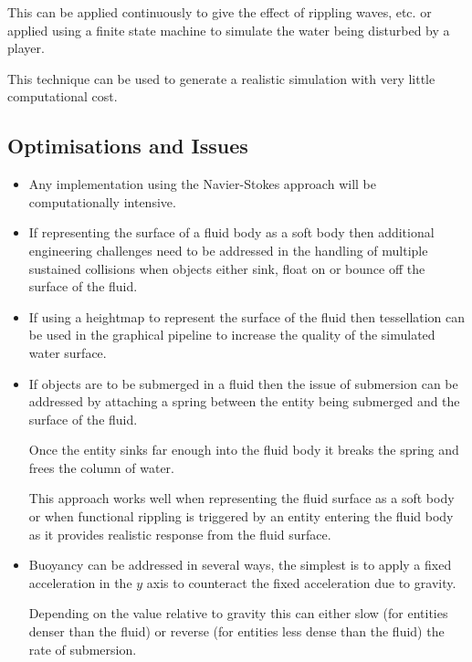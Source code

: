 \documentclass[a4paper]{article}
\begin{document}
This can be applied continuously to give the effect of rippling waves, etc. or
applied using a finite state machine to simulate the water being disturbed by a
player.

This technique can be used to generate a realistic simulation with very little
computational cost.

\subsection{Optimisations and Issues}

\begin{itemize}
  \item
    Any implementation using the Navier-Stokes approach will be computationally
    intensive.

  \item
    If representing the surface of a fluid body as a soft body then additional
    engineering challenges need to be addressed in the handling of multiple
    sustained collisions when objects either sink, float on or bounce off the
    surface of the fluid.

  \item
    If using a heightmap to represent the surface of the fluid then tessellation
    can be used in the graphical pipeline to increase the quality of the
    simulated water surface.

  \item
    If objects are to be submerged in a fluid then the issue of submersion can
    be addressed by attaching a spring between the entity being submerged and
    the surface of the fluid.

    Once the entity sinks far enough into the fluid body it breaks the spring
    and frees the column of water.

    This approach works well when representing the fluid surface as a soft body
    or when functional rippling is triggered by an entity entering the fluid
    body as it provides realistic response from the fluid surface.

  \item
    Buoyancy can be addressed in several ways, the simplest is to apply a fixed
    acceleration in the $y$ axis to counteract the fixed acceleration due to
    gravity.

    Depending on the value relative to gravity this can either slow (for
    entities denser than the fluid) or reverse (for entities less dense than the
    fluid) the rate of submersion.

\end{itemize}
\end{document}
